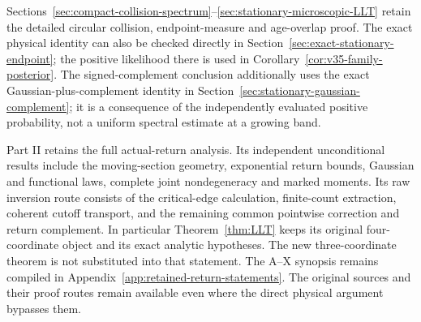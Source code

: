 Sections~\ref{sec:compact-collision-spectrum}--\ref{sec:stationary-microscopic-LLT}
retain the detailed circular collision, endpoint-measure and age-overlap
proof. The exact physical identity can also be checked directly in
Section~\ref{sec:exact-stationary-endpoint}; the positive likelihood
there is used in Corollary~\ref{cor:v35-family-posterior}.
The signed-complement conclusion additionally uses the exact
Gaussian-plus-complement identity in
Section~\ref{sec:stationary-gaussian-complement}; it is a consequence
of the independently evaluated positive probability, not a uniform
spectral estimate at a growing band.

Part II retains the full actual-return analysis. Its independent
unconditional results include the moving-section geometry, exponential
return bounds, Gaussian and functional laws, complete joint
nondegeneracy and marked moments. Its raw inversion route consists of
the critical-edge calculation, finite-count extraction, coherent cutoff
transport, and the remaining common pointwise correction and return
complement. In particular Theorem~\ref{thm:LLT} keeps its original
four-coordinate object and its exact analytic hypotheses. The new
three-coordinate theorem is not substituted into that statement.
The A--X synopsis remains compiled in
Appendix~\ref{app:retained-return-statements}. The original sources
and their proof routes remain available even where the direct physical
argument bypasses them.
